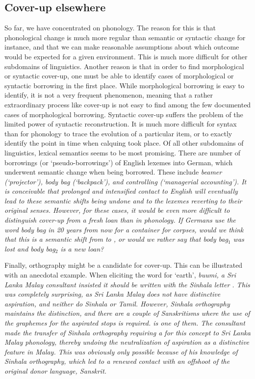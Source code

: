 \documentclass[a4paper,10pt]{article}
\begin{document}
\subsection{Cover-up elsewhere}
So far, we have concentrated on phonology. The reason for this is that phonological change is much more regular than semantic or syntactic change for instance, and that we can make reasonable assumptions about which outcome would be expected for a given environment. This is much more difficult for other subdomains of linguistics. Another reason is that in order to find morphological or syntactic cover-up, one must be able to identify cases of morphological or syntactic borrowing in the first place. While morphological borrowing is easy to identify, it is not a very frequent phenomenon, meaning that a rather extraordinary process like cover-up is not easy to find among the few documented cases of morphological borrowing. Syntactic cover-up suffers the problem of the limited power of syntactic reconstruction. It is much more difficult for syntax than for phonology to trace the evolution of a particular item, or to exactly identify the point in time when calquing took place.
Of all other subdomains of linguistics, lexical semantics seems to be most promising. There are number of borrowings (or `pseudo-borrowings') of English lexemes into German, which underwent semantic change when being borrowed. These include \em beamer \em (`projector'), \em body bag \em (`backpack'), and \em controlling \em (`managerial accounting'). It is conceivable that prolonged and intensified contact to English will eventually lead to these semantic shifts being undone and to the lexemes reverting to their original senses.
However, for these cases, it would be even more difficult to distinguish cover-up from a fresh loan than in phonology. If Germans use the word \em body bag \em in 20 years from now for a container for corpses, would we think that this is a semantic shift from  to , or would we rather say that \em body bag$_{1}$ \em was lost and \em body bag$_{2}$ \em is a new loan?

Finally, orthography might be a candidate for cover-up. This can be illustrated with an anecdotal example. When eliciting the word for `earth', \em buumi\em, a Sri Lanka Malay consultant insisted it should be written with the Sinhala letter . This was completely surprising, as Sri Lanka Malay does not have distinctive aspiration, and neither do Sinhala or Tamil. However, Sinhala orthography maintains the distinction, and there are a couple of Sanskritisms where the use of the graphemes for the aspirated stops is required.  is one of them. The consultant made the transfer of Sinhala orthography requiring a  for this concept to Sri Lanka Malay phonology, thereby undoing the neutralization of aspiration as a distinctive feature in Malay. This was obviously only possible because of his knowledge of Sinhala orthography, which led to a renewed contact with an offshoot of the original donor language, Sanskrit.
\end{document}
